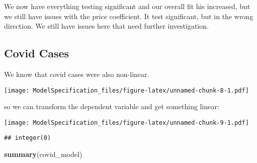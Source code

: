 \documentclass[
]{article}
\newenvironment{Shaded}{\begin{snugshade}}{\end{snugshade}}
\newcommand{\AttributeTok}[1]{\textcolor[rgb]{0.13,0.29,0.53}{#1}}
\newcommand{\FunctionTok}[1]{\textcolor[rgb]{0.13,0.29,0.53}{\textbf{#1}}}
\newcommand{\NormalTok}[1]{#1}
\newcommand{\OtherTok}[1]{\textcolor[rgb]{0.56,0.35,0.01}{#1}}
\newcommand{\SpecialCharTok}[1]{\textcolor[rgb]{0.81,0.36,0.00}{\textbf{#1}}}
\newcommand{\StringTok}[1]{\textcolor[rgb]{0.31,0.60,0.02}{#1}}
\begin{document}
We now have everything testing significant and our overall fit his
increased, but we still have issues with the price coefficient. It test
significant, but in the wrong direction. We still have issues here that
need further investigation.

\subsection{Covid Cases}\label{covid-cases}

We know that covid cases were also non-linear.

\begin{Shaded}
\end{Shaded}

\texttt{[image: ModelSpecification\_files/figure-latex/unnamed-chunk-8-1.pdf]}

so we can transform the dependent variable and get something linear:

\begin{Shaded}
\end{Shaded}

\texttt{[image: ModelSpecification\_files/figure-latex/unnamed-chunk-9-1.pdf]}

\begin{verbatim}
## integer(0)
\end{verbatim}

\begin{Shaded}
\begin{Highlighting}[]
\FunctionTok{summary}\NormalTok{(covid\_model)}
\end{Highlighting}
\end{Shaded}
\end{document}
